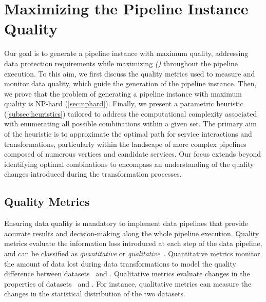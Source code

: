 \section{Maximizing the Pipeline Instance Quality}\label{sec:heuristics}
%
Our goal is to generate a pipeline instance with maximum quality, addressing data protection requirements while maximizing \textit{\quality (\q)} throughout the pipeline execution. To this aim, we first discuss the quality metrics used to measure and monitor data quality, which guide the generation of the pipeline instance. Then, we prove that the problem of generating a pipeline instance with maximum quality is NP-hard (\cref{sec:nphard}). Finally, we present a parametric heuristic (\cref{subsec:heuristics}) tailored to address the computational complexity associated with enumerating all possible combinations within a given set. The primary aim of the heuristic is to approximate the optimal path for service interactions and transformations, particularly within the landscape of more complex pipelines composed of numerous vertices and candidate services. Our focus extends beyond identifying optimal combinations to encompass an understanding of the quality changes introduced during the transformation processes.


\subsection{Quality Metrics}\label{subsec:metrics}
Ensuring data quality is mandatory to implement data pipelines that provide accurate results and decision-making along the whole pipeline execution. Quality metrics evaluate the information loss introduced at each step of the data pipeline, and can be classified as \emph{quantitative} or \emph{qualitative}~\cite{ADD}.
Quantitative metrics monitor the amount of data lost during data transformations to model the quality difference between datasets \origdataset\ and \transdataset.
Qualitative metrics evaluate changes in the properties of datasets \origdataset\ and \transdataset. For instance, qualitative metrics can measure the changes in the statistical distribution of the two datasets.

